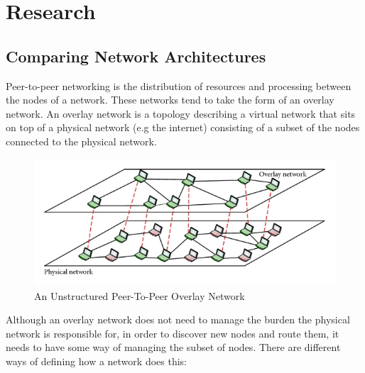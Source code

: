\documentclass[]{report}
\begin{document}
	\section{Research}
		\subsection*{Comparing Network Architectures}	
			Peer-to-peer networking is the distribution of resources and processing between the nodes of a network. These networks tend to take the form of an overlay network. An overlay network is a topology describing a virtual network that sits on top of a physical network (e.g the internet) consisting of a subset of the nodes connected to the physical network.
			
			\begin{figure}[h]
				\caption{
					An Unstructured Peer-To-Peer Overlay Network 	
					\cite{Unstructured P2P Diagram}
				}
				\centering
				\includegraphics{overlaynetwork.jpg}
			\end{figure}
			
			Although an overlay network does not need to manage the burden the physical network is responsible for, in order to discover new nodes and route them, it needs to have some way of managing the subset of nodes. There are different ways of defining how a network does this:
			
\end{document}
